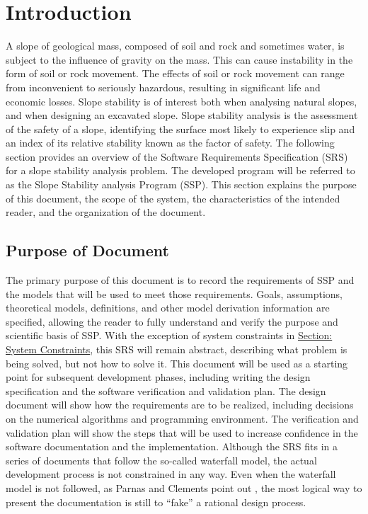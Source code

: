 \documentclass[12pt]{article}
\begin{document}
\section{Introduction}
\label{Sec:Intro}
A slope of geological mass, composed of soil and rock and sometimes water, is subject to the influence of gravity on the mass. This can cause instability in the form of soil or rock movement. The effects of soil or rock movement can range from inconvenient to seriously hazardous, resulting in significant life and economic losses. Slope stability is of interest both when analysing natural slopes, and when designing an excavated slope. Slope stability analysis is the assessment of the safety of a slope, identifying the surface most likely to experience slip and an index of its relative stability known as the factor of safety.
The following section provides an overview of the Software Requirements Specification (SRS) for a slope stability analysis problem. The developed program will be referred to as the Slope Stability analysis Program (SSP). This section explains the purpose of this document, the scope of the system, the characteristics of the intended reader, and the organization of the document.
\subsection{Purpose of Document}
\label{Sec:DocPurpose}
The primary purpose of this document is to record the requirements of SSP and the models that will be used to meet those requirements. Goals, assumptions, theoretical models, definitions, and other model derivation information are specified, allowing the reader to fully understand and verify the purpose and scientific basis of SSP. With the exception of system constraints in \hyperref[Sec:SysConstraints]{Section: System Constraints}, this SRS will remain abstract, describing what problem is being solved, but not how to solve it.
This document will be used as a starting point for subsequent development phases, including writing the design specification and the software verification and validation plan. The design document will show how the requirements are to be realized, including decisions on the numerical algorithms and programming environment. The verification and validation plan will show the steps that will be used to increase confidence in the software documentation and the implementation. Although the SRS fits in a series of documents that follow the so-called waterfall model, the actual development process is not constrained in any way. Even when the waterfall model is not followed, as Parnas and Clements point out \cite{parnasClements1986}, the most logical way to present the documentation is still to ``fake'' a rational design process.
\end{document}
